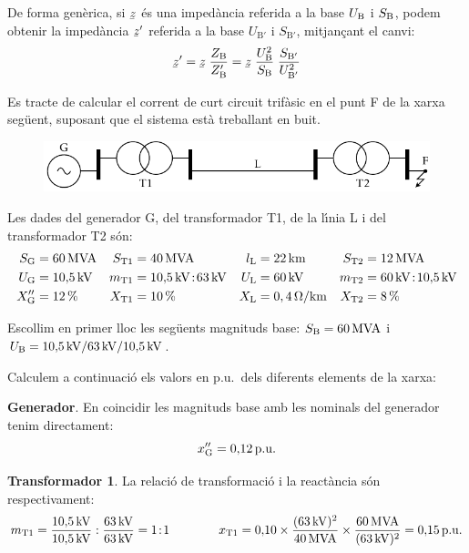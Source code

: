 De forma gen\`{e}rica, si $\cmplx{z}$ \'{e}s una imped\`{a}ncia referida a la base $U_\mathrm{B}$ i $S_\mathrm{B}$, podem obtenir la imped\`{a}ncia $\cmplx{z}'$ referida a la base $U_{\text{B}'}$ i $S_{\text{B}'}$, mitjan\c{c}ant el canvi:
\begin{equation}
   \cmplx{z}' = \cmplx{z} \; \frac{Z\ped{B}}{Z\ped{B}'} = \cmplx{z} \; \frac{U\ped{B}^2}{S\ped{B}} \; \frac{S_{\text{B}'}}{U_{\text{B}'}^2}
\end{equation}

\begin{exemple}

Es tracte de calcular el corrent de curt circuit trif\`{a}sic en el punt F de la xarxa seg\"{u}ent, suposant
que el sistema est\`{a} treballant en buit.
\begin{figure}[htb]
\vspace{3mm} \centering
    \includegraphics{Imatges/Cap-Fonaments-pu-Circuit1.pdf}
\end{figure}

Les dades del generador G, del transformador T1, de la l\'{\i}nia L i del transformador T2 s\'{o}n:
\begin{align*}
   S_\mathrm{G} &= 60\mathrm{\,MVA} & S_\mathrm{T1} &= 40\mathrm{\,MVA} & l_\mathrm{L} &= 22\mathrm{\,km} & S_\mathrm{T2} &= 12\mathrm{\,MVA} \\
   U_\mathrm{G} &= 10{,}5\mathrm{\,kV} & m_\mathrm{T1} &= 10{,}5\mathrm{\,kV}\!:\!63\mathrm{\,kV} & U_\mathrm{L} &= 60\mathrm{\,kV} & m_\mathrm{T2} &= 60\mathrm{\,kV}\!:\!10{,}5\mathrm{\,kV} \\
   X''_\mathrm{G} &= 12\mathrm{\,\%} & X_\mathrm{T1} &= 10\mathrm{\,\%} & X_\mathrm{L} &= 0,4\mathrm{\,\mathrm{\Omega}/km} & X_\mathrm{T2} &= 8\mathrm{\,\%}
\end{align*}

Escollim en primer lloc les seg\"{u}ents magnituds base: $S_\mathrm{B} = 60\mathrm{\,MVA}$ i $U_\mathrm{B}
= 10{,}5\mathrm{\,kV} / 63\mathrm{\,kV} / 10{,}5\mathrm{\,kV}$.

Calculem a continuaci\'{o} els valors en p.u.\ dels diferents elements de la xarxa:

\textbf{Generador}. En coincidir les magnituds base amb les nominals del generador tenim
 directament:
\[
x''_\mathrm{G} = 0{,}12\mathrm{\,p.u.}
\]

\textbf{Transformador 1}. La relaci\'{o} de transformaci\'{o} i la react\`{a}ncia s\'{o}n respectivament:
\[
m_\mathrm{T1} = \frac{10{,}5\mathrm{\,kV}}{10{,}5\mathrm{\,kV}} :
\frac{63\mathrm{\,kV}}{63\mathrm{\,kV}} = 1\!:\!1 \qquad\qquad x_\mathrm{T1} =
0{,}10 \times \frac{(63\mathrm{\,kV})^2}{40\mathrm{\,MVA}} \times
\frac{60\mathrm{\,MVA}}{(63\mathrm{\,kV})^2}  = 0{,}15\mathrm{\,p.u.}
\]


\end{exemple}
